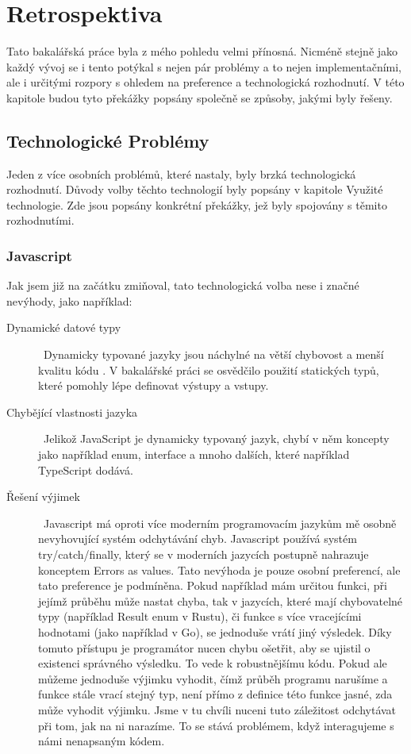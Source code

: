 \chapter{Retrospektiva}

Tato bakalářská práce byla z mého pohledu velmi přínosná. Nicméně stejně jako každý vývoj se i tento potýkal s nejen pár problémy a to nejen implementačními, ale i určitými rozpory s ohledem na preference a technologická rozhodnutí. V této kapitole budou tyto překážky popsány společně se způsoby, jakými byly řešeny.

\section{Technologické Problémy}

Jeden z více osobních problémů, které nastaly, byly brzká technologická rozhodnutí. Důvody volby těchto technologií byly popsány v kapitole Využité technologie. Zde jsou popsány konkrétní překážky, jež byly spojovány s těmito rozhodnutími.

\subsection{Javascript}
Jak jsem již na začátku zmiňoval, tato technologická volba nese i značné nevýhody, jako například:

\begin{description}
\item[Dynamické datové typy] \hfill \ Dynamicky typované jazyky jsou náchylné na větší chybovost a menší kvalitu kódu \cite{pang2018programming}. V bakalářské práci se osvědčilo použití statických typů, které pomohly lépe definovat výstupy a vstupy.
\item[Chybějící vlastnosti jazyka] \hfill \ Jelikož JavaScript je dynamicky typovaný jazyk, chybí v něm koncepty jako například enum, interface a mnoho dalších, které například TypeScript dodává.
\item[Řešení výjimek] \hfill \ Javascript má oproti více moderním programovacím jazykům mě osobně nevyhovující systém odchytávání chyb. Javascript používá systém try/catch/finally, který se v moderních jazycích postupně nahrazuje konceptem Errors as values. Tato nevýhoda je pouze osobní preferencí, ale tato preference je podmíněna. Pokud například mám určitou funkci, při jejímž průběhu může nastat chyba, tak v jazycích, které mají chybovatelné typy (například Result enum v Rustu), či funkce s více vracejícími hodnotami (jako například v Go), se jednoduše vrátí jiný výsledek. Díky tomuto přístupu je programátor nucen chybu ošetřit, aby se ujistil o existenci správného výsledku. To vede k robustnějšímu kódu. Pokud ale můžeme jednoduše výjimku vyhodit, čímž průběh programu narušíme a funkce stále vrací stejný typ, není přímo z definice této funkce jasné, zda může vyhodit výjimku. Jsme v tu chvíli nuceni tuto záležitost odchytávat při tom, jak na ni narazíme. To se stává problémem, když interagujeme s námi nenapsaným kódem.
\end{description}

